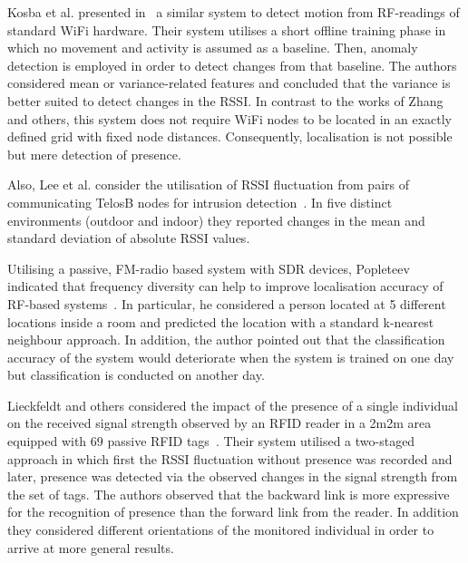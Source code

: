 \documentclass[journal]{IEEEtran}
\begin{document}
\begin{figure*}
Kosba et al. presented in~\cite{Pervasive_Kosba_2011} a similar system to detect motion from RF-readings of standard WiFi hardware.
Their system utilises a short offline training phase in which no movement and activity is assumed as a baseline. 
Then, anomaly detection is employed in order to detect changes from that baseline.
The authors considered mean or variance-related features and concluded that the variance is better suited to detect changes in the RSSI.
In contrast to the works of Zhang and others, this system does not require WiFi nodes to be located in an exactly defined grid with fixed node distances.
Consequently, localisation is not possible but mere detection of presence. 

Also, Lee et al. consider the utilisation of RSSI fluctuation from pairs of communicating TelosB nodes for intrusion detection~\cite{RFSensing_Lee_2010}.
In five distinct environments (outdoor and indoor) they reported changes in the mean and standard deviation of absolute RSSI values. 

Utilising a passive, FM-radio based system with SDR devices, Popleteev indicated that frequency diversity can help to improve localisation accuracy of RF-based systems~\cite{DeviceFreeRecognition_Popleteev_2013}.
In particular, he considered a person located at 5 different locations inside a room and predicted the location with a standard k-nearest neighbour approach. 
In addition, the author pointed out that the classification accuracy of the system would deteriorate when the system is trained on one day but classification is conducted on another day.

Lieckfeldt and others considered the impact of the presence of a single individual on the received signal strength observed by an RFID reader in a 2m2m area equipped with 69 passive RFID tags~\cite{DeviceFreeRecognition_Lieckfeldt_2009}.
Their system utilised a two-staged approach in which first the RSSI fluctuation without presence was recorded and later, presence was detected via the observed changes in the signal strength from the set of tags.
The authors observed that the backward link is more expressive for the recognition of presence than the forward link from the reader. 
In addition they considered different orientations of the monitored individual in order to arrive at more general results.


\end{figure*}
\end{document}

